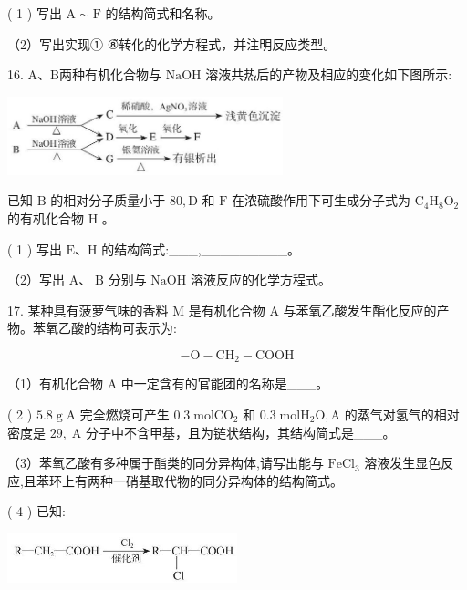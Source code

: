 \documentclass[10pt]{article}
\begin{document}
( 1 ) 写出 \(\mathrm{A} \sim \mathrm{F}\) 的结构简式和名称。

（2）写出实现① \~⑧转化的化学方程式，并注明反应类型。

16. A、B两种有机化合物与 \(\mathrm{{NaOH}}\) 溶液共热后的产物及相应的变化如下图所示:

\begin{center}
\includegraphics[max width=0.6\textwidth]{images/0190efc5-b58a-7c43-bfb0-e0a030df9cfd_101_228855.jpg}
\end{center}

已知 \(\mathrm{B}\) 的相对分子质量小于 \({80},\mathrm{D}\) 和 \(\mathrm{F}\) 在浓硫酸作用下可生成分子式为 \({\mathrm{C}}_{4}{\mathrm{H}}_{8}{\mathrm{O}}_{2}\) 的有机化合物 \(\mathrm{H}\) 。

( 1 ) 写出 \(\mathrm{E}\text{、}\mathrm{H}\) 的结构简式:\_\_\_,\_\_\_\_\_\_\_\_\_。

（2）写出 \(\mathrm{A}\text{、}\mathrm{\;B}\) 分别与 \(\mathrm{{NaOH}}\) 溶液反应的化学方程式。

17. 某种具有菠萝气味的香料 \(\mathrm{M}\) 是有机化合物 \(\mathrm{A}\) 与苯氧乙酸发生酯化反应的产物。苯氧乙酸的结构可表示为:

\[
- \mathrm{O} - {\mathrm{{CH}}}_{2} - \mathrm{{COOH}}
\]

（1）有机化合物 \(\mathrm{A}\) 中一定含有的官能团的名称是\_\_\_。

( 2 ) \({5.8}\mathrm{\;g}\mathrm{\;A}\) 完全燃烧可产生 \({0.3}\mathrm{\;{mol}}{\mathrm{{CO}}}_{2}\) 和 \({0.3}\mathrm{\;{mol}}{\mathrm{H}}_{2}\mathrm{O},\mathrm{A}\) 的蒸气对氢气的相对密度是 \({29},\mathrm{\;A}\) 分子中不含甲基，且为链状结构，其结构简式是\_\_\_。

（3）苯氧乙酸有多种属于酯类的同分异构体,请写出能与 \({\mathrm{{FeCl}}}_{3}\) 溶液发生显色反应,且苯环上有两种一硝基取代物的同分异构体的结构简式。

( 4 ) 已知:

\begin{center}
\includegraphics[max width=0.5\textwidth]{images/0190efc5-b58a-7c43-bfb0-e0a030df9cfd_102_405051.jpg}
\end{center}
\end{document}
